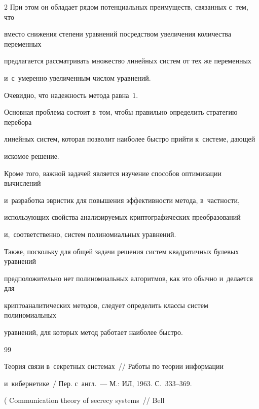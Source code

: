 \begin{multicols}{2}
При этом он обладает рядом потенциальных преимуществ, связанных с~тем, что 


вместо снижения степени уравнений посредством увеличения количества переменных 


предлагается рассматривать множество линейных систем от тех же переменных 


и~с~умеренно увеличенным числом уравнений.


Очевидно, что надежность метода равна~$1$.





Основная проблема состоит в~том, чтобы правильно определить стратегию перебора 


линейных систем, которая позволит наиболее быстро \mbox{прийти} к~системе, дающей 


искомое решение.


Кроме того, важной задачей является изучение способов оптимизации вычислений 


и~разработка эвристик для повышения эффективности метода, в~част\-ности, 


использующих свойства анализируемых криптографических преобразований 


и,~соответственно, сис\-тем полиномиальных уравнений.


Также, поскольку для общей задачи решения систем квадратичных булевых уравнений 


предположительно нет полиномиальных алгоритмов, как это обычно и~делается для 


криптоаналитических методов, следует определить классы систем полиномиальных 


уравнений, для которых метод работает наиболее быстро.





{\small\frenchspacing


 {%




 \begin{thebibliography}{99}






        Теория связи в~секретных системах~// Работы по теории информации 


        и~кибернетике~/ Пер. с~англ.~--- М.: ИЛ, 1963. С.~333--369.


        ( Communication theory of secrecy systems~// Bell 



\end{thebibliography}}}
\end{multicols}
